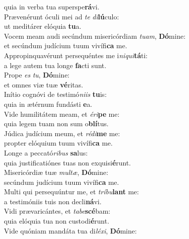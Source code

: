 \oddverse quia in verba tua superspe\textbf{rá}vi.\\
\evenverse Prævenérunt óculi mei ad \textit{te} \textit{di}\textbf{lú}culo:~\*\\
\evenverse ut meditárer elóquia \textbf{tu}a.\\
\oddverse Vocem meam audi secúndum misericórdiam \textit{tu}\textit{am}, \textbf{Dó}mine:~\*\\
\oddverse et secúndum judícium tuum vivífi\textbf{ca} me.\\
\evenverse Appropinquavérunt persequéntes me i\textit{ni}\textit{qui}\textbf{tá}ti:~\*\\
\evenverse a lege autem tua longe \textbf{fa}cti sunt.\\
\oddverse Prope \textit{es} \textit{tu}, \textbf{Dó}mine:~\*\\
\oddverse et omnes viæ tuæ \textbf{vé}ritas.\\
\evenverse Inítio cognóvi de testimó\textit{ni}\textit{is} \textbf{tu}is:~\*\\
\evenverse quia in ætérnum fundásti \textbf{e}a.\\
\oddverse Vide humilitátem meam, et \textit{é}\textit{ri}\textbf{pe} me:~\*\\
\oddverse quia legem tuam non sum o\textbf{blí}tus.\\
\evenverse Júdica judícium meum, et \textit{ré}\textit{di}\textbf{me} me:~\*\\
\evenverse propter elóquium tuum vivífi\textbf{ca} me.\\
\oddverse Longe a peccató\textit{ri}\textit{bus} \textbf{sa}lus:~\*\\
\oddverse quia justificatiónes tuas non exquisi\textbf{é}runt.\\
\evenverse Misericórdiæ tuæ \textit{mul}\textit{tæ}, \textbf{Dó}mine:~\*\\
\evenverse secúndum judícium tuum vivífi\textbf{ca} me.\\
\oddverse Multi qui persequúntur me, et \textit{trí}\textit{bu}\textbf{lant} me:~\*\\
\oddverse a testimóniis tuis non decli\textbf{ná}vi.\\
\evenverse Vidi prævaricántes, et \textit{ta}\textit{be}\textbf{scé}bam:~\*\\
\evenverse quia elóquia tua non custodi\textbf{é}runt.\\
\oddverse Vide quóniam mandáta tua di\textit{lé}\textit{xi}, \textbf{Dó}mine:~\*\\
